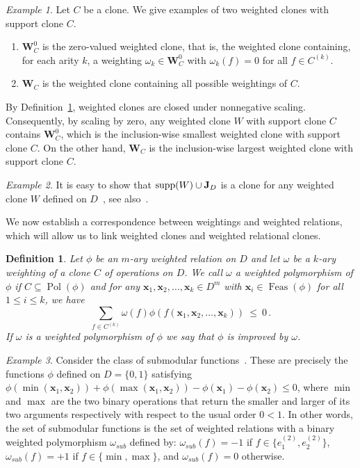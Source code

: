 \documentclass[11pt, reqno]{article}
\newcommand{\tup}[1]{\ensuremath{\mathbf #1}}
\DeclareMathOperator{\supp}{{\rm supp}}
\DeclareMathOperator{\dom}{{Feas}}
\DeclareMathOperator{\pol}{Pol}
\newtheorem{definition}{Definition}
\theoremstyle{remark}
\newtheorem{example}{Example}
\begin{document}
\begin{example}\label{ex:wclones}
Let $C$ be a clone. We give examples of two weighted clones with support
clone $C$.

\begin{enumerate}
\item $\mathbf{W}_C^0$ is the zero-valued weighted clone, that is, the
weighted clone containing, for each arity $k$, a weighting
$\omega_k\in\mathbf{W}_C^0$ with
$\omega_k(f)=0$ for all $f\in C^{(k)}$.

\item $\mathbf{W}_C$ is the weighted clone containing all possible weightings of $C$.
\end{enumerate}

By Definition~\ref{ex:wclones}, weighted clones are closed under nonnegative
scaling. Consequently, by scaling by zero, any weighted clone
$W$ with support clone $C$ contains $\mathbf{W}_C^0$, which is the
inclusion-wise smallest weighted clone with support clone $C$. On the other
hand, $\mathbf{W}_C$ is the inclusion-wise largest weighted clone with support
clone $C$.
\end{example}

\begin{example}
It is easy to show that $\supp(W)\cup\mathbf{J}_D$ is a clone for any weighted clone
$W$ defined on $D$~\cite{cccjz13:sicomp}, see
also~\cite{Kozik15:icalp,tz15:icalp}.
\end{example}

We now establish a correspondence between weightings and weighted relations, which will
allow us to link weighted clones and weighted relational clones.
%
\begin{definition} \label{def:wp} 
%
Let $\phi$ be an $m$-ary weighted relation 
on $D$ and let $\omega$ be a $k$-ary weighting of a clone $C$ of
operations on $D$.
%
We call $\omega$ a \emph{weighted polymorphism}
of $\phi$ if $C\subseteq\pol(\phi)$ and for any
$\tup{x}_1,\tup{x}_2,\ldots,\tup{x}_k \in D^m$ with
$\tup{x}_i\in\dom(\phi)$ 
for all $1\leq i\leq k$, we have 
\begin{equation}\label{eq:WPOL}
  \sum_{f \in C^{(k)}}\omega(f)\phi(f(\tup{x}_1,\tup{x}_2,\ldots,\tup{x}_k)) \ \leq\ 0\,.
\end{equation}
%
%
If $\omega$ is a weighted polymorphism of $\phi$ we say that $\phi$ is \emph{improved} by $\omega$.
\end{definition}
%
\begin{example}
%
Consider the class of submodular functions~\cite{Nemhauser88:optimization}.
These are precisely the functions $\phi$ defined on $D=\{0,1\}$ satisfying
$\phi(\min(\tup{x}_1,\tup{x}_2)) + \phi(\max(\tup{x}_1,\tup{x}_2)) -
\phi(\tup{x}_1) - \phi(\tup{x}_2) \leq 0$, where $\min$ and $\max$ are the two
binary operations that return the smaller and larger of its two arguments
respectively with respect to the usual order $0<1$. In other words, the set of submodular
functions is the set of weighted relations with a binary weighted polymorphism
$\omega_{sub}$ defined by: $\omega_{sub}(f)=-1$ if $f \in
\{e_1^{(2)},e_2^{(2)}\}$, $\omega_{sub}(f)=+1$ if $f \in
\{\min,\max\}$, and $\omega_{sub}(f)=0$ otherwise.
%
\end{example}
\end{document}
